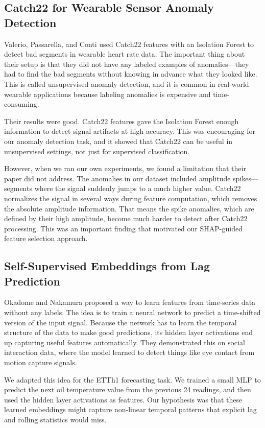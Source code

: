 \documentclass[10pt,conference]{IEEEtran}
\begin{document}
\subsection{Catch22 for Wearable Sensor Anomaly Detection}

Valerio, Passarella, and Conti \cite{ppg_anom} used Catch22 features with an Isolation Forest to detect bad segments in wearable heart rate data. The important thing about their setup is that they did not have any labeled examples of anomalies---they had to find the bad segments without knowing in advance what they looked like. This is called unsupervised anomaly detection, and it is common in real-world wearable applications because labeling anomalies is expensive and time-consuming.

Their results were good. Catch22 features gave the Isolation Forest enough information to detect signal artifacts at high accuracy. This was encouraging for our anomaly detection task, and it showed that Catch22 can be useful in unsupervised settings, not just for supervised classification.

However, when we ran our own experiments, we found a limitation that their paper did not address. The anomalies in our dataset included amplitude spikes---segments where the signal suddenly jumps to a much higher value. Catch22 normalizes the signal in several ways during feature computation, which removes the absolute amplitude information. That means the spike anomalies, which are defined by their high amplitude, become much harder to detect after Catch22 processing. This was an important finding that motivated our SHAP-guided feature selection approach.

\subsection{Self-Supervised Embeddings from Lag Prediction}

Okadome and Nakamura \cite{lag_op} proposed a way to learn features from time-series data without any labels. The idea is to train a neural network to predict a time-shifted version of the input signal. Because the network has to learn the temporal structure of the data to make good predictions, its hidden layer activations end up capturing useful features automatically. They demonstrated this on social interaction data, where the model learned to detect things like eye contact from motion capture signals.

We adapted this idea for the ETTh1 forecasting task. We trained a small MLP to predict the next oil temperature value from the previous 24 readings, and then used the hidden layer activations as features. Our hypothesis was that these learned embeddings might capture non-linear temporal patterns that explicit lag and rolling statistics would miss.
\end{document}
